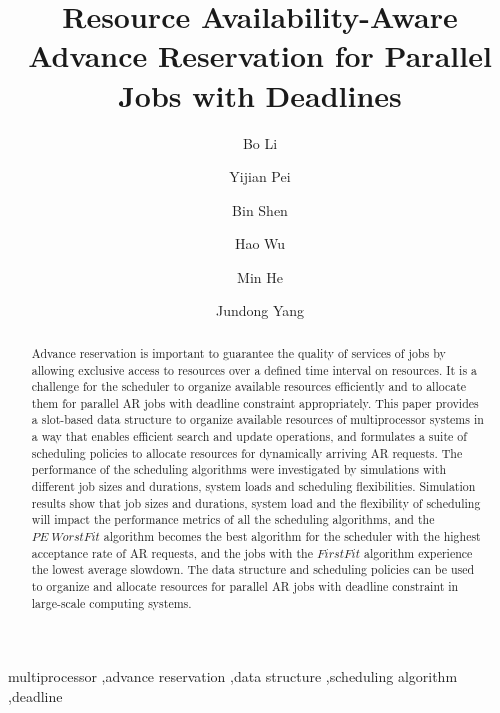\documentclass[preprint,12pt]{elsarticle}
\begin{document}
\begin{frontmatter}


\title{Resource Availability-Aware Advance Reservation for Parallel Jobs with Deadlines}

\author[ynu]{Bo Li}
\author[ynu]{Yijian Pei}
\author[whut]{Bin Shen}
\author[ynu]{Hao Wu}
\author[ynu]{Min He}
\author[ynu]{Jundong Yang}



\address[ynu]{School of Information Science and Engineering, Yunnan University, Kunming 650091, China}
\address[whut]{School of Electrical and Information Engineering, Wuhan Institute of Technology, Wuhan 430073, China}



\begin{abstract}
Advance reservation is important to guarantee the quality of services of jobs by allowing exclusive access to resources over a defined time interval on resources. It is a challenge for the scheduler to organize available resources efficiently and to allocate them for parallel AR jobs with deadline constraint appropriately. This paper provides a slot-based data structure to organize available resources of multiprocessor systems in a way that enables efficient search and update operations, and formulates a suite of scheduling policies to allocate resources for dynamically arriving AR requests. The performance of the scheduling algorithms were investigated by simulations with different job sizes and durations, system loads and scheduling flexibilities. Simulation results show that job sizes and durations, system load and the flexibility of scheduling will impact the performance metrics of all the scheduling algorithms, and the $PE\; Worst Fit$ algorithm becomes the best algorithm for the scheduler with the highest acceptance rate of AR requests, and the jobs with the $First Fit$ algorithm experience the lowest average slowdown. The data structure and scheduling policies can be used to organize and allocate resources for parallel AR jobs with deadline constraint in large-scale computing systems.
\end{abstract}


\begin{keyword}


multiprocessor \sep advance reservation \sep data structure  \sep scheduling algorithm \sep deadline



\end{keyword}

\end{frontmatter}
\end{document}

